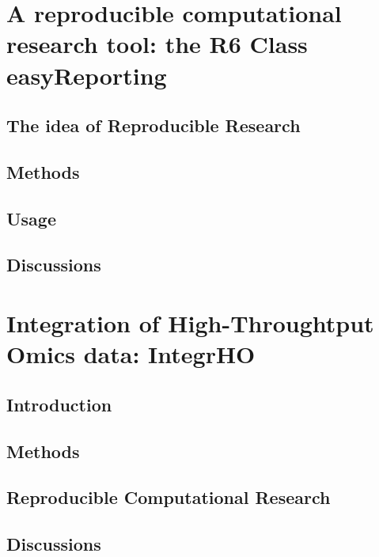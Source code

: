 \documentclass[b5paper, oneside, british, intoc, bibliograph=totoc, index=totoc, BCOR10mm, twoside, openright]{book}
\numberwithin{equation}{section}
\numberwithin{figure}{section}
\begin{document}

\chapter{A reproducible computational research tool: the R6 Class easyReporting}

\section{The idea of Reproducible Research}

\section{Methods}

\section{Usage}

\section{Discussions}



\chapter{Integration of High-Throughtput Omics data: IntegrHO} \label{sec:integrhocap}

\section{Introduction} \label{sec:integrhointro}

\section{Methods}  \label{sec:integrhometh}

\section{Reproducible Computational Research} \label{sec:integrhorr}

\section{Discussions} \label{sec:integrhofuture}

\end{document}

